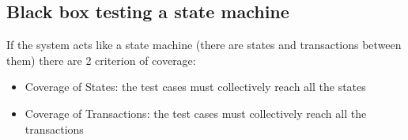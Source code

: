 \subsection{Black box testing a state machine}
If the system acts like a state machine (there are states and transactions between them) there are 2 criterion of coverage:
\begin{itemize}
    \item Coverage of States: the test cases must collectively reach all the states
    \item Coverage of Transactions: the test cases must collectively reach all the transactions
\end{itemize}
